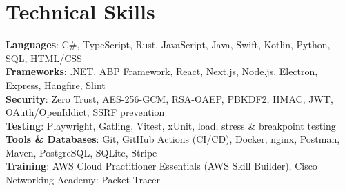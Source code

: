 \documentclass[a4paper,11pt]{article}
\begin{document}
\section{Technical Skills}
 \begin{itemize}[leftmargin=0.15in, label={}]
    \small{\item{
     \textbf{Languages}{: C\#, TypeScript, Rust, JavaScript, Java, Swift, Kotlin, Python, SQL, HTML/CSS} \\
     \textbf{Frameworks}{: .NET, ABP Framework, React, Next.js, Node.js, Electron, Express, Hangfire, Slint} \\
     \textbf{Security}{: Zero Trust, AES-256-GCM, RSA-OAEP, PBKDF2, HMAC, JWT, OAuth/OpenIddict, SSRF prevention} \\
     \textbf{Testing}{: Playwright, Gatling, Vitest, xUnit, load, stress \& breakpoint testing} \\
     \textbf{Tools \& Databases}{: Git, GitHub Actions (CI/CD), Docker, nginx, Postman, Maven, PostgreSQL, SQLite, Stripe} \\
     \textbf{Training}{: AWS Cloud Practitioner Essentials (AWS Skill Builder), Cisco Networking Academy: Packet Tracer}
    }}
 \end{itemize}


\end{document}
